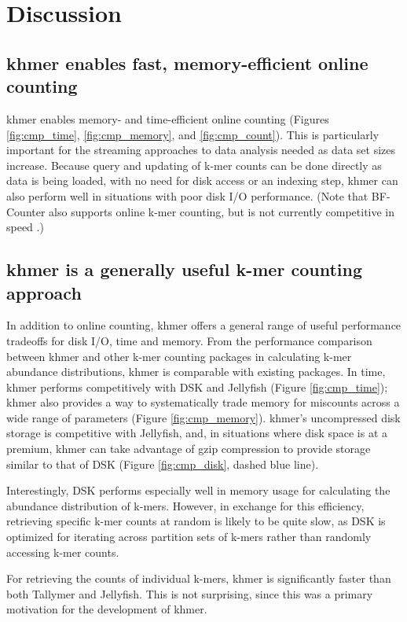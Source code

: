 \documentclass[10pt]{article}
\begin{document}
\section*{Discussion}


\subsection*{khmer enables fast, memory-efficient online counting}

khmer enables memory- and time-efficient online counting (Figures \ref{fig:cmp_time}, 
\ref{fig:cmp_memory}, and \ref{fig:cmp_count}).  This is
particularly important for the streaming approaches to data analysis
needed as data set sizes increase.  Because query and updating of
k-mer counts can be done directly as data is being loaded, with no
need for disk access or an indexing step, khmer can also perform
well in situations with poor disk I/O performance.  (Note that BF-Counter
also supports online k-mer counting, but is not currently competitive
in speed \cite{Deorowicz2013}.)

\subsection*{khmer is a generally useful k-mer counting approach}

In addition to online counting, khmer offers a general range of useful
performance tradeoffs for disk I/O, time and memory.  From the
performance comparison between khmer and other k-mer counting packages
in calculating k-mer abundance distributions, khmer is comparable with
existing packages.  In time, khmer performs competitively with DSK and
Jellyfish (Figure \ref{fig:cmp_time}); khmer also provides a way to systematically trade 
memory for miscounts across a wide range of parameters (Figure \ref{fig:cmp_memory}).  khmer's
uncompressed disk storage is competitive with Jellyfish, and, in
situations where disk space is at a premium, khmer can take advantage
of gzip compression to provide storage similar to that of DSK (Figure \ref{fig:cmp_disk}, 
dashed blue line).

Interestingly, DSK performs especially well in memory usage
for calculating the abundance distribution of k-mers. However, in
exchange for this efficiency, retrieving specific k-mer counts at
random is likely to be quite slow, as DSK is optimized for iterating
across partition sets of k-mers rather than randomly accessing k-mer
counts.

For retrieving the counts of individual k-mers, khmer is significantly faster than both
Tallymer and Jellyfish.  This is not surprising, since this was a
primary motivation for the development of khmer.
\end{document}
